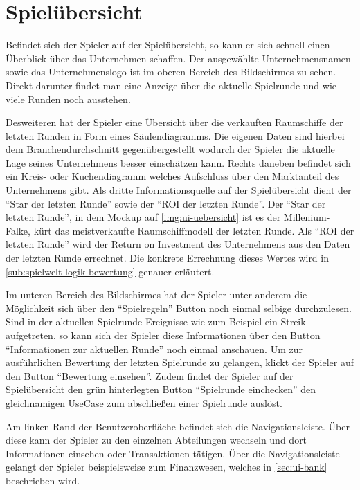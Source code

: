 \section{Spielübersicht}
\label{sec:ui-uebersicht}


Befindet sich der Spieler auf der Spielübersicht, so kann er sich schnell einen Überblick über das Unternehmen schaffen. Der ausgewählte Unternehmensnamen sowie das Unternehmenslogo ist im oberen Bereich des Bildschirmes zu sehen. Direkt darunter findet man eine Anzeige über die aktuelle Spielrunde und wie viele Runden noch ausstehen. 

Desweiteren hat der Spieler eine Übersicht über die verkauften Raumschiffe der letzten Runden in Form eines Säulendiagramms. Die eigenen Daten sind hierbei dem Branchendurchschnitt gegenübergestellt wodurch der Spieler die aktuelle Lage seines Unternehmens besser einschätzen kann. Rechts daneben befindet sich ein Kreis- oder Kuchendiagramm welches Aufschluss über den Marktanteil des Unternehmens gibt. Als dritte Informationsquelle auf der Spielübersicht dient der “Star der letzten Runde” sowie der “ROI der letzten Runde”. Der “Star der letzten Runde”, in dem Mockup auf \vref{img:ui-uebersicht} ist es der Millenium-Falke, kürt das meistverkaufte Raumschiffmodell der letzten Runde. Als “ROI der letzten Runde” wird der Return on Investment des Unternehmens aus den Daten der letzten Runde errechnet. Die konkrete Errechnung dieses Wertes wird in \vref{sub:spielwelt-logik-bewertung} genauer erläutert.

Im unteren Bereich des Bildschirmes hat der Spieler unter anderem die Möglichkeit sich über den “Spielregeln” Button noch einmal selbige durchzulesen. Sind in der aktuellen Spielrunde Ereignisse wie zum Beispiel ein Streik aufgetreten, so kann sich der Spieler diese Informationen über den Button “Informationen zur aktuellen Runde” noch einmal anschauen. Um zur ausführlichen Bewertung der letzten Spielrunde zu gelangen, klickt der Spieler auf den Button “Bewertung einsehen”. Zudem findet der Spieler auf der Spielübersicht den grün hinterlegten Button “Spielrunde einchecken” den gleichnamigen UseCase zum abschließen einer Spielrunde auslöst. 

Am linken Rand der Benutzeroberfläche befindet sich die Navigationsleiste. Über diese kann der Spieler zu den einzelnen Abteilungen wechseln und dort Informationen einsehen oder Transaktionen tätigen. Über die Navigationsleiste gelangt der Spieler beispielsweise zum Finanzwesen, welches in \ref{sec:ui-bank} beschrieben wird. 

